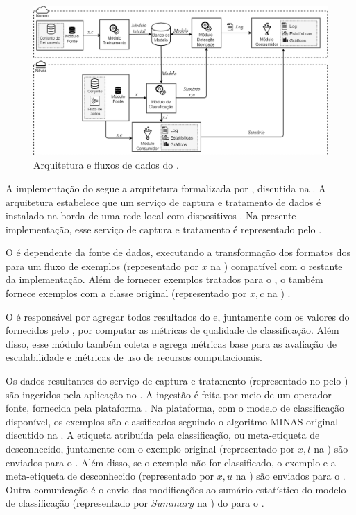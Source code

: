 \begin{figure}[ht]
\centering
\includegraphics[width=\textwidth]{figuras/mfog-arch-v3_pt-br.png}
\caption{Arquitetura e fluxos de dados do \mfog.}
\label{fig:arch}
\end{figure}

A implementação do \mfog segue a arquitetura \idsiot formalizada por
, discutida na .
A arquitetura \idsiot
estabelece que um serviço de
captura e tratamento de dados é instalado na borda de uma rede local com
dispositivos \iot.
Na presente implementação, esse serviço de captura e tratamento é representado
pelo \source.

O \source é dependente da fonte de dados, executando a transformação dos
formatos dos \datasets para um fluxo de exemplos (representado por $x$ na )
compatível com o restante da implementação.
Além de fornecer exemplos tratados para o \classify, o \source também fornece
exemplos com a classe original (representado por $x,c$ na )
.

O \sink é responsável por agregar todos resultados do \mfog e,
juntamente com os valores do \dataset fornecidos pelo \source, por computar
as métricas de qualidade de classificação.
Além disso, esse módulo também coleta e agrega métricas base para as avaliação de
escalabilidade e métricas de uso de recursos computacionais.

Os dados resultantes do serviço de captura e tratamento 
(representado no \mfog pelo \source) são ingeridos pela aplicação no \classify.
A ingestão é feita por meio de um operador fonte, fornecida pela plataforma
\flink.
Na plataforma, com o modelo de classificação disponível, os exemplos são
classificados seguindo o algoritmo MINAS original discutido na .
A etiqueta atribuída pela classificação, ou meta-etiqueta de desconhecido,
juntamente com o exemplo original (representado por $x,l$ na )
são enviados para o \sink.
Além disso, se o exemplo não for classificado, o exemplo e a meta-etiqueta de
desconhecido (representado por $x,u$ na ) são enviados para o
\detector.
Outra comunicação é o envio das modificações ao sumário estatístico do modelo de
classificação (representado por $Summary$ na ) do \classify para o
\detector.

